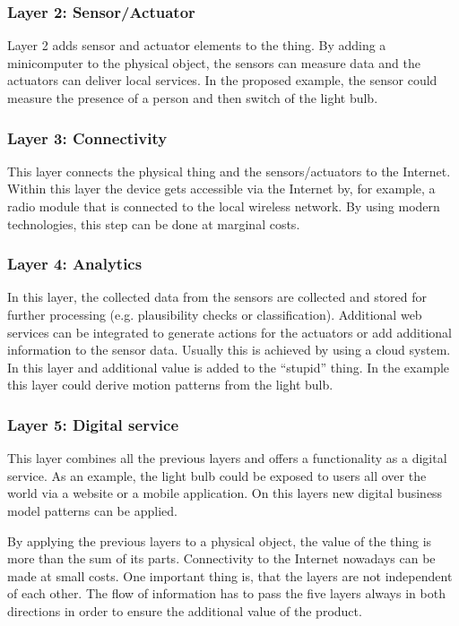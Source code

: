 \subsubsection{Layer 2: Sensor/Actuator}
Layer 2 adds sensor and actuator elements to the thing. By adding a minicomputer to the physical object, the sensors can measure data and the actuators can deliver local services. In the proposed example, the sensor could measure the presence of a person and then switch of the light bulb.

\subsubsection{Layer 3: Connectivity}
This layer connects the physical thing and the sensors/actuators to the Internet. Within this layer the device gets accessible via the Internet by, for example, a radio module that is connected to the local wireless network. By using modern technologies, this step can be done at marginal costs.

\subsubsection{Layer 4: Analytics}
In this layer, the collected data from the sensors are collected and stored for further processing (e.g. plausibility checks or classification). Additional web services can be integrated to generate actions for the actuators or add additional information to the sensor data. Usually this is achieved by using a cloud system. In this layer and additional value is added to the ``stupid'' thing. In the example this layer could derive motion patterns from the light bulb.

\subsubsection{Layer 5: Digital service}
This layer combines all the previous layers and offers a functionality as a digital service. As an example, the light bulb could be exposed to users all over the world via a website or a mobile application. On this layers new digital business model patterns can be applied.

By applying the previous layers to a physical object, the value of the thing is more than the sum of its parts. Connectivity to the Internet nowadays can be made at small costs. One important thing is, that the layers are not independent of each other. The flow of information has to pass the five layers always in both directions in order to ensure the additional value of the product.

